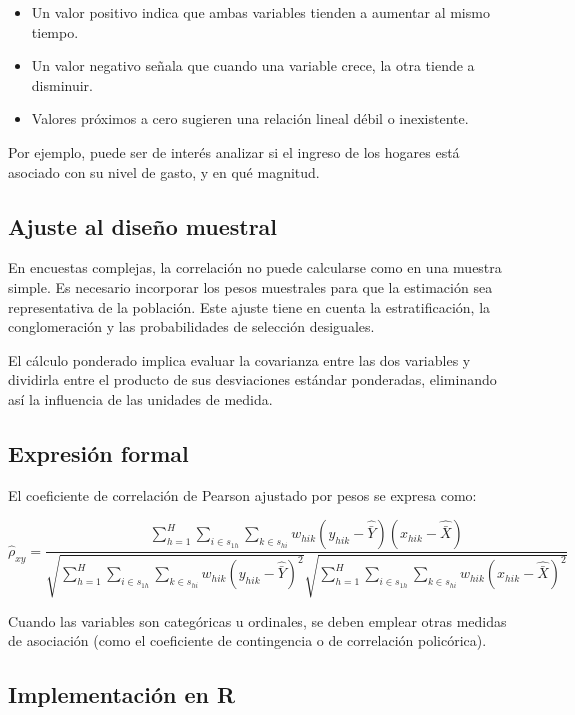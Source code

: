 \documentclass[
  spanish,
  12pt,
]{book}
\providecommand{\tightlist}{%
  \setlength{\itemsep}{0pt}\setlength{\parskip}{0pt}}
\begin{document}
\begin{itemize}
\tightlist
\item
  Un valor positivo indica que ambas variables tienden a aumentar al mismo tiempo.
\item
  Un valor negativo señala que cuando una variable crece, la otra tiende a disminuir.
\item
  Valores próximos a cero sugieren una relación lineal débil o inexistente.
\end{itemize}

Por ejemplo, puede ser de interés analizar si el ingreso de los hogares está asociado con su nivel de gasto, y en qué magnitud.

\subsection{Ajuste al diseño muestral}\label{ajuste-al-diseuxf1o-muestral}

En encuestas complejas, la correlación no puede calcularse como en una muestra simple. Es necesario incorporar los pesos muestrales para que la estimación sea representativa de la población. Este ajuste tiene en cuenta la estratificación, la conglomeración y las probabilidades de selección desiguales.

El cálculo ponderado implica evaluar la covarianza entre las dos variables y dividirla entre el producto de sus desviaciones estándar ponderadas, eliminando así la influencia de las unidades de medida.

\subsection{Expresión formal}\label{expresiuxf3n-formal}

El coeficiente de correlación de Pearson ajustado por pesos se expresa como:

\[\hat{\rho}_{xy} = \frac{\displaystyle \sum_{h=1}^{H} \sum_{i \in s_{1h}} \sum_{k \in s_{hi}} w_{hik} (y_{hik} - \widehat{\bar{Y}})(x_{hik} - \widehat{\bar{X}})} {\sqrt{\displaystyle \sum_{h=1}^{H} \sum_{i \in s_{1h}} \sum_{k \in s_{hi}} w_{hik} (y_{hik} - \widehat{\bar{Y}})^2} \sqrt{\displaystyle \sum_{h=1}^{H} \sum_{i \in s_{1h}} \sum_{k \in s_{hi}} w_{hik} (x_{hik} - \widehat{\bar{X}})^2}}\]

Cuando las variables son categóricas u ordinales, se deben emplear otras medidas de asociación (como el coeficiente de contingencia o de correlación policórica).

\subsection{Implementación en R}\label{implementaciuxf3n-en-r}
\end{document}
